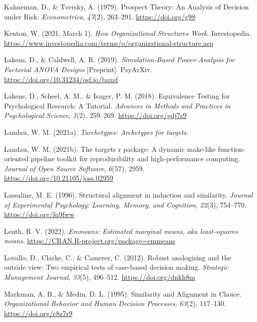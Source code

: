 \documentclass[
  man, donotrepeattitle,floatsintext]{apa7}
\newlength{\cslhangindent}
\newlength{\cslentryspacingunit} %
\newenvironment{CSLReferences}[2] %
 {%
  \setlength{\parindent}{0pt}
  \ifodd #1
  \let\oldpar\par
  \def\par{\hangindent=\cslhangindent\oldpar}
  \fi
  \setlength{\parskip}{#2\cslentryspacingunit}
 }%
 {}
\theoremstyle{definition}
\theoremstyle{definition}
\theoremstyle{definition}
\theoremstyle{definition}
\theoremstyle{remark}
\begin{document}
\begin{CSLReferences}{1}{0}
\leavevmode{}%
Kahneman, D., \& Tversky, A. (1979). Prospect {Theory}: {An Analysis} of {Decision} under {Risk}. \emph{Econometrica}, \emph{47}(2), 263--291. \url{https://doi.org/g98}

\leavevmode{}%
Kenton, W. (2021, March 1). \emph{How {Organizational Structures Work}}. {Investopedia}. \url{https://www.investopedia.com/terms/o/organizational-structure.asp}

\leavevmode{}%
Lakens, D., \& Caldwell, A. R. (2019). \emph{Simulation-{Based Power-Analysis} for {Factorial ANOVA Designs}} {[}Preprint{]}. {PsyArXiv}. \url{https://doi.org/10.31234/osf.io/baxsf}

\leavevmode{}%
Lakens, D., Scheel, A. M., \& Isager, P. M. (2018). Equivalence {Testing} for {Psychological Research}: {A Tutorial}. \emph{Advances in Methods and Practices in Psychological Science}, \emph{1}(2), 259--269. \url{https://doi.org/gdj7s9}

\leavevmode{}%
Landau, W. M. (2021a). \emph{Tarchetypes: Archetypes for targets}.

\leavevmode{}%
Landau, W. M. (2021b). The targets r package: A dynamic make-like function-oriented pipeline toolkit for reproducibility and high-performance computing. \emph{Journal of Open Source Software}, \emph{6}(57), 2959. \url{https://doi.org/10.21105/joss.02959}

\leavevmode{}%
Lassaline, M. E. (1996). Structural alignment in induction and similarity. \emph{Journal of Experimental Psychology: Learning, Memory, and Cognition}, \emph{22}(3), 754--770. \url{https://doi.org/fq9fww}

\leavevmode{}%
Lenth, R. V. (2022). \emph{Emmeans: Estimated marginal means, aka least-squares means}. \url{https://CRAN.R-project.org/package=emmeans}

\leavevmode{}%
Lovallo, D., Clarke, C., \& Camerer, C. (2012). Robust analogizing and the outside view: Two empirical tests of case-based decision making. \emph{Strategic Management Journal}, \emph{33}(5), 496--512. \url{https://doi.org/dnkh8m}

\leavevmode{}%
Markman, A. B., \& Medin, D. L. (1995). Similarity and {Alignment} in {Choice}. \emph{Organizational Behavior and Human Decision Processes}, \emph{63}(2), 117--130. \url{https://doi.org/c8z7r9}


\end{CSLReferences}
\end{document}
